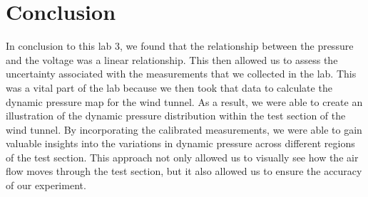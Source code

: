 \chapter{Conclusion}
\label{cp:conclusion}
In conclusion to this lab 3, we found that the relationship between the pressure and the voltage was a linear relationship. This then allowed us to assess the uncertainty associated with the measurements that we collected in the lab. This was a vital part of the lab because we then took that data to calculate the dynamic pressure map for the wind tunnel. As a result, we were able to create an illustration of the dynamic pressure distribution within the test section of the wind tunnel. By incorporating the calibrated measurements, we were able to gain valuable insights into the variations in dynamic pressure across different regions of the test section. This approach not only allowed us to visually see how the air flow moves through the test section, but it also allowed us to ensure the accuracy of our experiment. 